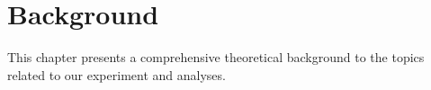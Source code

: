\chapter{Background}\label{ch: background}

This chapter presents a comprehensive theoretical background to the topics related to our experiment and analyses.
